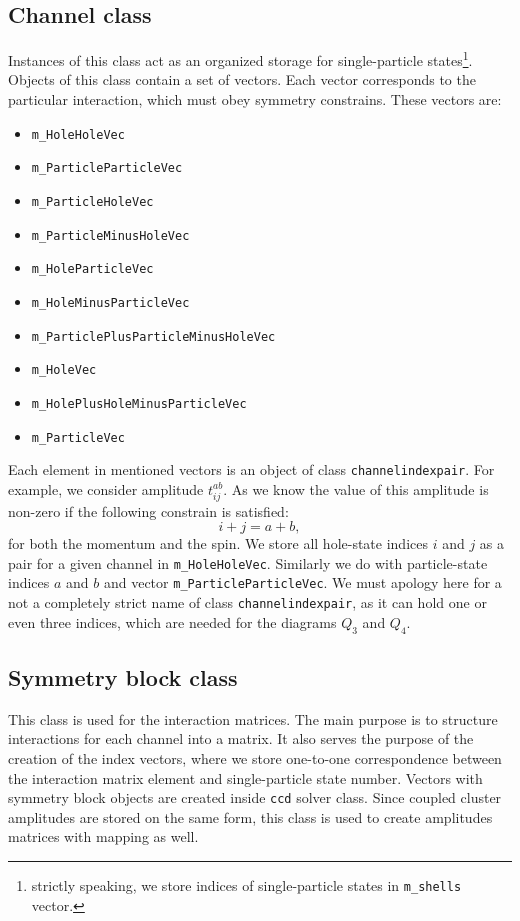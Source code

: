\documentclass[twoside,english]{uiofysmaster}
\newcommand{\classname}[1]{\texttt{#1}}
\begin{document}
\subsection{Channel class}\label{channelsection}
Instances of this class act as an organized storage for
single-particle states\footnote{strictly speaking, we store indices of
	single-particle states in \classname{m_shells} vector.}.  Objects of
this class contain a set of vectors. Each vector corresponds to the
particular interaction, which must obey symmetry constrains. These
vectors are:
\begin{itemize}
	\item \classname{m_HoleHoleVec}
	\item \classname{m_ParticleParticleVec}
	\item \classname{m_ParticleHoleVec}
	\item \classname{m_ParticleMinusHoleVec}
	\item \classname{m_HoleParticleVec}
	\item \classname{m_HoleMinusParticleVec}
	\item \classname{m_ParticlePlusParticleMinusHoleVec}
	\item \classname{m_HoleVec}
	\item \classname{m_HolePlusHoleMinusParticleVec}
	\item \classname{m_ParticleVec}
\end{itemize}
Each element in mentioned vectors is an object of class \classname{channelindexpair}. For example, we consider amplitude $t_{ij}^{ab}$. As we know the value of this amplitude is non-zero if the following constrain is satisfied:
\begin{equation}
i + j = a + b,
\end{equation} 										
for both the momentum and the spin. We store all hole-state indices
$i$ and $j$ as a pair for a given channel in
\classname{m_HoleHoleVec}. Similarly we do with particle-state indices
$a$ and $b$ and vector \classname{m_ParticleParticleVec}. We must
apology here for a not a completely strict name of class
\classname{channelindexpair}, as it can hold one or even three
indices, which are needed for the diagrams $Q_3$ and $Q_4$.

\subsection{Symmetry block class}\label{symblocksection}
This class is used for the interaction matrices. The main purpose is
to structure interactions for each channel into a matrix. It also
serves the purpose of the creation of the index vectors, where we
store one-to-one correspondence between the interaction matrix element
and single-particle state number.  Vectors with symmetry block objects
are created inside \classname{ccd} solver class.  Since coupled
cluster amplitudes are stored on the same form, this class is used to
create amplitudes matrices with mapping as well.
\end{document}
